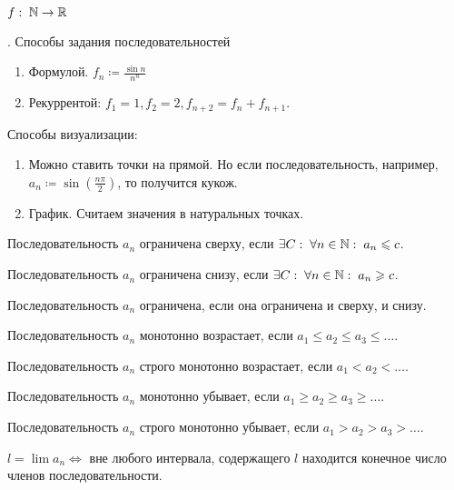  \begin{definition}
   $f: \; \mathbb{N} \to \mathbb{R}$ 
\end{definition}.
\slashn
Способы задания последовательностей
\begin{enumerate}
    \item Формулой. $f_n \coloneqq \frac{\sin n}{n^n}$ 
    \item Рекуррентой: $f_1 = 1, f_2=2, f_{n+2} = f_n + f_{n+1}$.
\end{enumerate}
Способы визуализации:
\begin{enumerate}
    \item Можно ставить точки на прямой. Но если последовательность, например, $a_n \coloneqq \sin(\frac{n \pi}{2})$, то получится кукож.
    \item График. Считаем значения в натуральных точках.
\end{enumerate}
\begin{definition}
    Последовательность $a_n$ ограничена сверху, если  $\exists C: \; \forall n \in \mathbb{N}: \; a_n \leqslant c$.
\end{definition}
\begin{definition}
    Последовательность $a_n$ ограничена снизу, если  $\exists C: \; \forall n \in \mathbb{N}: \; a_n \geqslant c$.
\end{definition}
\begin{definition}
    Последовательность $a_n$ ограничена, если она ограничена и сверху, и снизу.
\end{definition}
\begin{definition}
    Последовательность $a_n$ монотонно возрастает, если  $a_1 \le a_2 \le a_3 \le \ldots$.
\end{definition}
\begin{definition}
    Последовательность $a_n$ строго монотонно возрастает, если  $a_1 < a_2 < \ldots$.
\end{definition}
\begin{definition}
    Последовательность $a_n$ монотонно убывает, если  $a_1 \ge a_2 \ge a_3 \ge \ldots$.
\end{definition}
\begin{definition}
    Последовательность $a_n$ строго монотонно убывает, если  $a_1 > a_2 > a_3 > \ldots$.
\end{definition}
\begin{definition}
    $l = \lim a_n \iff$ вне любого интервала, содержащего $l$ находится конечное число членов последовательности. 
\end{definition}
